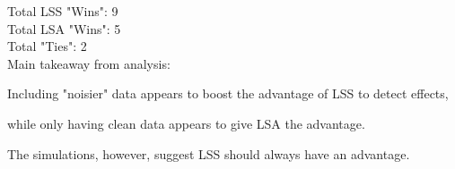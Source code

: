 \documentclass[10pt,letterpaper]{article}
\newlength\savedwidth
\newcommand\thickhline{\noalign{\global\savedwidth\arrayrulewidth\global\arrayrulewidth 2pt}%
\hline
\noalign{\global\arrayrulewidth\savedwidth}}
\newcommand{\lorem}{{\bf LOREM}}
\newcommand{\ipsum}{{\bf IPSUM}}
\begin{document}
Total LSS "Wins": 9\\
Total LSA "Wins": 5\\
Total "Ties": 2\\

Main takeaway from analysis:

Including "noisier" data appears to boost
the advantage of LSS to detect effects,

while only having clean data appears to give
LSA the advantage.

The simulations, however, suggest LSS should
always have an advantage.



\end{document}
